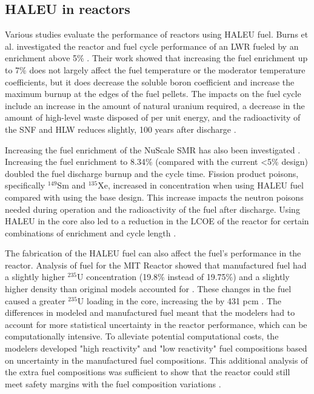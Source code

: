 \subsection{HALEU in reactors}
Various studies evaluate the performance of reactors 
using \gls{HALEU} fuel. Burns et al. investigated the reactor and fuel cycle 
performance of an \gls{LWR} fueled by an enrichment above 5\% \cite{burns_reactor_2020}.
Their work showed that increasing the fuel enrichment up to 7\% does not 
largely affect the fuel temperature or the moderator temperature coefficients,
but it does decrease the soluble boron coefficient and increase the maximum 
burnup at the edges of the fuel pellets. The impacts on the fuel cycle include 
an increase in the amount of natural uranium required, a decrease in the 
amount of high-level waste disposed of per unit energy, and the 
radioactivity of the \gls{SNF} and \gls{HLW} reduces slightly, 100 years 
after discharge \cite{burns_reactor_2020}.

Increasing the fuel enrichment of the NuScale \gls{SMR} has also been 
investigated \cite{carlson_implications_2022}. Increasing the fuel 
enrichment to 8.34\% (compared with the current <5\% design) doubled 
the fuel discharge burnup and the cycle time. 
Fission product poisons, specifically $^{149}$Sm and $^{135}$Xe, increased 
in concentration when using \gls{HALEU} fuel compared with using the base 
design. This increase impacts the 
neutron poisons needed during operation and the radioactivity of 
the fuel after discharge. Using \gls{HALEU} in the core also led to a 
reduction in the \gls{LCOE} of the reactor for certain combinations of 
enrichment and cycle length \cite{carlson_economic_2020,carlson_implications_2022}.

The fabrication of the \gls{HALEU} fuel can also affect the fuel's 
performance in the reactor. Analysis of fuel for the \gls{MIT} 
Reactor showed that manufactured fuel had a slightly higher $^{235}$U 
concentration (19.8\% instead of 19.75\%) and a slightly higher 
density than original models accounted for \cite{mascolino_impact_2022}. 
These changes in the fuel caused a greater $^{235}$U loading in the core, 
increasing the \keff by 431 pcm \cite{mascolino_impact_2022}. The 
differences in modeled and manufactured fuel meant that the modelers 
had to account for more statistical uncertainty in the reactor performance, 
which can be computationally intensive. To alleviate potential 
computational costs, the modelers developed "high reactivity" and 
"low reactivity" fuel compositions based on uncertainty in the manufactured 
fuel compositions. This additional analysis of the extra fuel compositions 
was sufficient to show that the reactor could still meet safety margins 
with the fuel composition variations \cite{mascolino_impact_2022}.

